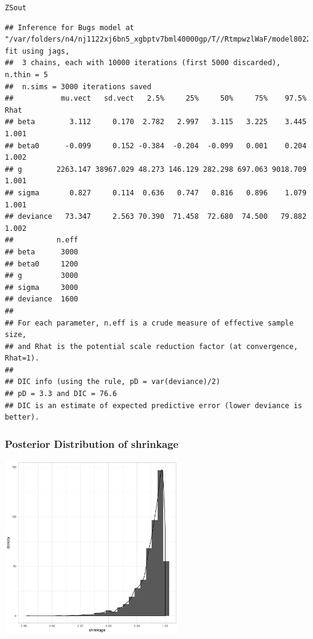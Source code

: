 \documentclass[handout]{beamer}\usepackage[]{graphicx}\usepackage[]{color}
\makeatletter
\newcommand{\hlstd}[1]{\textcolor[rgb]{0.345,0.345,0.345}{#1}}%
\newenvironment{kframe}{%
 \def\at@end@of@kframe{}%
 \ifinner\ifhmode%
  \def\at@end@of@kframe{\end{minipage}}%
  \begin{minipage}{\columnwidth}%
 \fi\fi%
 \def\FrameCommand##1{\hskip\@totalleftmargin \hskip-\fboxsep
 \colorbox{shadecolor}{##1}\hskip-\fboxsep
     \hskip-\linewidth \hskip-\@totalleftmargin \hskip\columnwidth}%
 \MakeFramed {\advance\hsize-\width
   \@totalleftmargin\z@ \linewidth\hsize
   \@setminipage}}%
 {\par\unskip\endMakeFramed%
 \at@end@of@kframe}
\newenvironment{knitrout}{}{} %
\makeatother
\begin{document}
\begin{frame}[fragile]
\begin{tiny}
\begin{knitrout}
\color{fgcolor}\begin{kframe}
\begin{alltt}
\hlstd{ZSout}
\end{alltt}
\begin{verbatim}
## Inference for Bugs model at "/var/folders/n4/nj1122xj6bn5_xgbptv7bml40000gp/T//RtmpwzlWaF/model8022471112d1.txt", fit using jags,
##  3 chains, each with 10000 iterations (first 5000 discarded), n.thin = 5
##  n.sims = 3000 iterations saved
##           mu.vect   sd.vect   2.5%     25%     50%     75%    97.5%  Rhat
## beta        3.112     0.170  2.782   2.997   3.115   3.225    3.445 1.001
## beta0      -0.099     0.152 -0.384  -0.204  -0.099   0.001    0.204 1.002
## g        2263.147 38967.029 48.273 146.129 282.298 697.063 9018.709 1.001
## sigma       0.827     0.114  0.636   0.747   0.816   0.896    1.079 1.001
## deviance   73.347     2.563 70.390  71.458  72.680  74.500   79.882 1.002
##          n.eff
## beta      3000
## beta0     1200
## g         3000
## sigma     3000
## deviance  1600
## 
## For each parameter, n.eff is a crude measure of effective sample size,
## and Rhat is the potential scale reduction factor (at convergence, Rhat=1).
## 
## DIC info (using the rule, pD = var(deviance)/2)
## pD = 3.3 and DIC = 76.6
## DIC is an estimate of expected predictive error (lower deviance is better).
\end{verbatim}
\end{kframe}
\end{knitrout}
\end{tiny}
\end{frame}

\begin{frame}[fragile]\frametitle{Posterior Distribution of shrinkage}

\begin{knitrout}
\color{fgcolor}
\includegraphics[width=3in,height=3in]{figure/marginal-1} 

\end{knitrout}


\end{frame}
\end{document}
